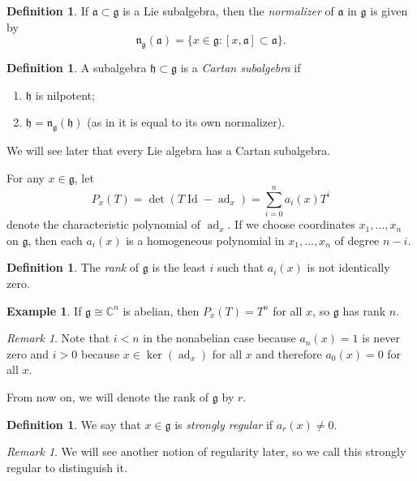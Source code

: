 \documentclass{amsart}
\theoremstyle{definition}
\newtheorem{defn}[thm]{Definition}
\newtheorem{exm}[thm]{Example}
\theoremstyle{remark}
\newtheorem{rmk}[thm]{Remark}
\theoremstyle{plain}
\theoremstyle{definition}
\theoremstyle{remark}
\newcommand{\C}{\mathbb{C}}
\newcommand{\g}{\mathfrak{g}}
\newcommand{\h}{\mathfrak{h}}
\newcommand{\n}{\mathfrak{n}}
\newcommand{\mf}[1]{\mathfrak{#1}}
\newcommand{\on}[1]{\operatorname{#1}}
\newcommand{\1}{\mathbf{1}}
\newcommand{\2}{\mathbf{2}}
\newcommand{\3}{\mathbf{3}}
\DeclareMathOperator{\ad}{ad}
\begin{document}
\begin{defn}
    If \(\mf{a} \subset \g\) is a Lie subalgebra, then the \textit{normalizer} of \(\mf{a}\) in \(\g\) is given by
    \[ \n_{\g}(\mf{a}) = \{ x \in \g : [x, \mf{a}] \subset \mf{a} \}. \]
\end{defn}

\begin{defn}
    A subalgebra \(\h \subset \g\) is a \textit{Cartan subalgebra} if 
    \begin{enumerate}
        \item \(\h\) is nilpotent;
        \item \(\h = \n_{\g}(\h)\) (as in it is equal to its own normalizer).
    \end{enumerate}
\end{defn}

We will see later that every Lie algebra has a Cartan subalgebra.

For any \(x \in \g\), let 
\[ P_x(T) = \det(T \on{Id} - \ad_x) = \sum_{i=0}^n a_i(x) T^i \] 
denote the characteristic polynomial of \(\ad_x\). If we choose coordinates \(x_1, \ldots, x_n\) on \(\g\), then each \(a_i(x)\) is a homogeneous polynomial in \(x_1, \ldots, x_n\) of degree \(n-i\). 

\begin{defn}
    The \textit{rank} of \(\g\) is the least \(i\) such that \(a_i(x)\) is not identically zero.
\end{defn}

\begin{exm}
    If \(\g \cong \C^n\) is abelian, then \(P_x(T) = T^n\) for all \(x\), so \(\g\) has rank \(n\).
\end{exm}

\begin{rmk}
    Note that \(i < n\) in the nonabelian case because \(a_n(x) = 1\) is never zero and \(i > 0\) because \(x \in \ker(\ad_x)\) for all \(x\) and therefore \(a_0(x) = 0\) for all \(x\).
\end{rmk}

From now on, we will denote the rank of \(\g\) by \(r\).

\begin{defn}
    We say that \(x \in \g \) is \textit{strongly regular} if \(a_r(x) \neq 0\).
\end{defn}

\begin{rmk}
    We will see another notion of regularity later, so we call this strongly regular to distinguish it.
\end{rmk}
\end{document}
